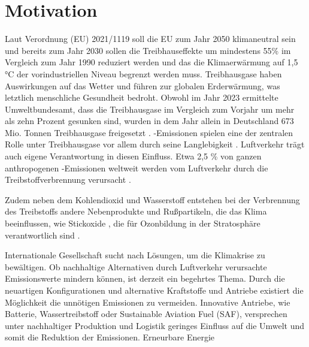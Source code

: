 \chapter{Motivation}
\label{ch:Einleitung}

Laut Verordnung (EU) 2021/1119 soll die EU zum Jahr 2050 klimaneutral sein und bereits zum Jahr 2030 sollen die Treibhauseffekte um mindestens 55\%
im Vergleich zum Jahr 1990 reduziert werden und das die Klimaerwärmung auf 1,5 °C der vorindustriellen Niveau begrenzt werden muss.
Treibhausgase haben Auswirkungen auf das Wetter und führen zur globalen Erderwärmung, was letztlich menschliche Gesundheit bedroht. 
Obwohl im Jahr 2023 ermittelte Umweltbundesamt, dass die Treibhausgase im Vergleich zum Vorjahr um mehr als zehn Prozent gesunken sind, 
wurden in dem Jahr allein in Deutschland 673 Mio. Tonnen Treibhausgase freigesetzt \cite{bundesregierung}.
-Emissionen spielen eine der zentralen Rolle unter Treibhausgase vor allem durch seine Langlebigkeit \cite{filonchyk2024greenhouse}. 
Luftverkehr trägt auch eigene Verantwortung in diesen Einfluss. 
Etwa 2,5 \% von ganzen anthropogenen -Emissionen weltweit werden vom Luftverkehr
durch die Treibstoffverbrennung verursacht \cite{conrady2019luftverkehr}. 

Zudem neben dem Kohlendioxid  und Wasserstoff  entstehen bei der Verbrennung des Treibstoffs andere Nebenprodukte und Rußpartikeln, die 
das Klima beeinflussen, wie Stickoxide , die für Ozonbildung in der Stratosphäre verantwortlich sind \cite{conrady2019luftverkehr}.

Internationale Gesellschaft sucht nach Lösungen, um die Klimakrise zu bewältigen. 
Ob nachhaltige Alternativen durch Luftverkehr verursachte Emissionswerte mindern können, ist derzeit ein begehrtes Thema.
Durch die neuartigen Konfigurationen und alternative Kraftstoffe und Antriebe existiert die Möglichkeit die unnötigen Emissionen zu vermeiden.
Innovative Antriebe, wie Batterie, Wassertreibstoff oder Sustainable Aviation Fuel (SAF), versprechen unter nachhaltiger Produktion und
Logistik geringes Einfluss auf die Umwelt und somit die Reduktion der Emissionen.  Erneurbare Energie

